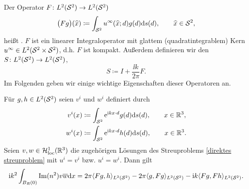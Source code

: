 Der Operator \(F\colon L^2(\mathcal{S}^2) \to L^2(\mathcal{S}^2)\)
\begin{equation}
	\label{fernfeldoperator}
	\big(Fg\big)(\widehat{x})\coloneqq\int_{\mathcal{S}^2} u^\infty(\widehat{x};d)g(d)\mathrm{d}s(d),\qquad \widehat{x}\in\mathcal{S}^2,
\end{equation}
heißt . \(F\) ist ein linearer Integraloperator mit glattem (quadratintegrablem) Kern \(u^\infty\in L^2(\mathcal{S}^2\times\mathcal{S}^2)\), d.h. \(F\) ist kompakt. Außerdem definieren wir den  \(S\colon L^2(\mathcal{S}^2) \to L^2(\mathcal{S}^2)\),
\begin{equation*}
	S\coloneqq I+\frac{\ii k}{2\pi}F.
\end{equation*}
Im Folgenden geben wir einige wichtige Eigenschaften dieser Operatoren an.
\begin{lem}\label{lem: definition von vi und wi}
	Für \(g,h\in L^2(\mathcal{S}^2)\) seien \(v^i\) und \(w^i\) definiert durch
	\begin{align}
		\label{eigenschaft Streuoperator 1}
		v^i(x)&\coloneqq\int_{\mathcal{S}^2}\mathrm{e}^{\mathrm{i} kx\cdot d}g(d)\mathrm{d}s(d),\qquad x\in\mathbb{R}^3,\\
		\label{eigenschaft Streuoperator 2}
		w^i(x)&\coloneqq\int_{\mathcal{S}^2}\mathrm{e}^{\mathrm{i} kx\cdot d}h(d)\mathrm{d}s(d),\qquad x\in\mathbb{R}^3.
	\end{align}
	Seien \(v,w\in\mathcal{H}_{\mathrm{loc}}^1(\mathbb{R}^3)\) die zugehörigen Lösungen des Streuproblems \eqref{direktes streuproblem} mit \(u^i=v^i\) bzw. \(u^i=w^i\). Dann gilt
	\begin{equation}
		\label{eigenschaft Streuoperator folgerung}
		\mathrm{i} k^2\int_{B_R(0)}\operatorname{Im}(n^2)v\overline{w}\mathrm{d}x=2\pi\langle Fg, h\rangle_{L^2(\mathcal{S}^2)}-2\pi\langle g, Fg\rangle_{L^2(\mathcal{S}^2)}-\mathrm{i} k\langle Fg, Fh\rangle_{L^2(\mathcal{S}^2)}.
	\end{equation}
\end{lem}
